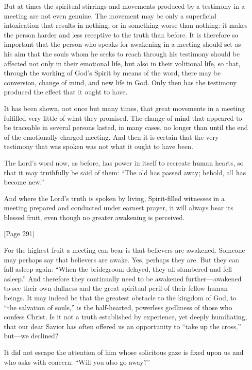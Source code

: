 But at times the spiritual stirrings and movements produced by a testimony in a meeting are not even genuine. The movement may be only a superficial intoxication that results in nothing, or in something worse than nothing: it makes the person harder and less receptive to the truth than before. It is therefore so important that the person who speaks for awakening in a meeting should set as his aim that the souls whom he seeks to reach through his testimony should be affected not only in their emotional life, but also in their volitional life, so that, through the working of God’s Spirit by means of the word, there may be conversion, change of mind, and new life in God. Only then has the testimony produced the effect that it ought to have.

It has been shown, not once but many times, that great movements in a meeting fulfilled very little of what they promised. The change of mind that appeared to be traceable in several persons lasted, in many cases, no longer than until the end of the emotionally charged meeting. And then it is certain that the very testimony that was spoken was not what it ought to have been.

The Lord’s word now, as before, has power in itself to recreate human hearts, so that it may truthfully be said of them: “The old has passed away; behold, all has become new.”

And where the Lord’s truth is spoken by living, Spirit-filled witnesses in a meeting prepared and conducted under earnest prayer, it will always bear its blessed fruit, even though no greater awakening is perceived.

[Page 291]

For the highest fruit a meeting can bear is that believers are awakened. Someone may perhaps say that believers are awake. Yes, perhaps they are. But they can fall asleep again: “When the bridegroom delayed, they all slumbered and fell asleep.” And therefore they continually need to be awakened further—awakened to see their own dullness and the great spiritual peril of their fellow human beings. It may indeed be that the greatest obstacle to the kingdom of God, to “the salvation of souls,” is the half-hearted, powerless godliness of those who confess Christ. Is it not a truth established by experience, yet deeply humiliating, that our dear Savior has often offered us an opportunity to “take up the cross,” but—we declined?

It did not escape the attention of him whose solicitous gaze is fixed upon us and who asks with concern: “Will you also go away?”

